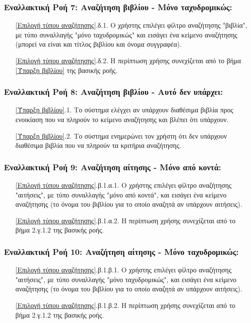 \documentclass[12pt,a4paper]{article}
\begin{document}
\subsubsection*{Εναλλακτική Ροή 7: Αναζήτηση βιβλίου - Μόνο ταχυδρομικώς:}
\begin{enumerate}
    \item[\ref{Επιλογή τύπου αναζήτησης}.δ.1.] Ο χρήστης επιλέγει φίλτρο αναζήτησης "βιβλία", με τύπο συναλλαγής "μόνο ταχυδρομικώς" και εισάγει ένα κείμενο αναζήτησης (μπορεί να είναι και τίτλος βιβλίου και όνομα συγγραφέα).
    \item[\ref{Επιλογή τύπου αναζήτησης}.δ.2.] Η περίπτωση χρήσης συνεχίζεται από το βήμα \ref{Ύπαρξη βιβλίου} της βασικής ροής.
\end{enumerate}

\subsubsection*{Εναλλακτική Ροή 8: Αναζήτηση βιβλίου - Αυτό δεν υπάρχει:}
\begin{enumerate}
    \item[\ref{Ύπαρξη βιβλίου}.1.] Το σύστημα ελέγχει αν υπάρχουν διαθέσιμα βιβλία προς ενοικίαση που να πληρούν το κείμενο αναζήτησης και βλέπει ότι υπάρχουν.
    \item[\ref{Ύπαρξη βιβλίου}.2.] Το σύστημα ενημερώνει τον χρήστη ότι δεν υπάρχουν διαθέσιμα βιβλία που να πληρούν τα κριτήρια αναζήτησης. 
\end{enumerate}

\subsubsection*{Εναλλακτική Ροή 9: Αναζήτηση αίτησης - Μόνο από κοντά:}
\begin{enumerate}
    \item[\ref{Επιλογή τύπου αναζήτησης}.β.1.α.1.] Ο χρήστης επιλέγει φίλτρο αναζήτησης "αιτήσεις", με τύπο συναλλαγής "μόνο από κοντά", και εισάγει ένα κείμενο αναζήτησης (το όνομα του βιβλίου για το οποίο αναζητά αν υπάρχουν αιτήσεις).
    \item[\ref{Επιλογή τύπου αναζήτησης}.β.1.α.2.] Η περίπτωση χρήσης συνεχίζεται από το βήμα 2.γ.1.2 της βασικής ροής.
\end{enumerate}

\subsubsection*{Εναλλακτική Ροή 10: Αναζήτηση αίτησης - Μόνο ταχυδρομικώς:}
\begin{enumerate}
    \item[\ref{Επιλογή τύπου αναζήτησης}.β.1.β.1.] Ο χρήστης επιλέγει φίλτρο αναζήτησης "αιτήσεις", με τύπο συναλλαγής "μόνο ταχυδρομικώς", και εισάγει ένα κείμενο αναζήτησης (το όνομα του βιβλίου για το οποίο αναζητά αν υπάρχουν αιτήσεις).
    \item[\ref{Επιλογή τύπου αναζήτησης}.β.1.β.2.] Η περίπτωση χρήσης συνεχίζεται από το βήμα 2.γ.1.2 της βασικής ροής.
\end{enumerate}
\end{document}
